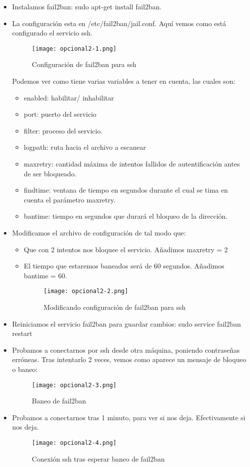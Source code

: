 	\begin{itemize}
		\item Instalamos fail2ban: sudo apt-get install fail2ban.
		\item La configuración esta en /etc/fail2ban/jail.conf. Aquí vemos como está configurado el servicio ssh.
		\begin{figure}[H]	
			\centering
			\texttt{[image: opcional2-1.png]} 
			\label{figura119} 
			\caption{Configuración de fail2ban para ssh}
		\end{figure} 
		Podemos ver como tiene varias variables a tener en cuenta, las cuales son:
		\begin{itemize}
			\item enabled: habilitar/ inhabilitar
			\item port: puerto del servicio
			\item filter: proceso del servicio.
			\item logpath: ruta hacia el archivo a escanear
			\item maxretry: cantidad máxima de intentos fallidos de autentificación antes de ser bloqueado.
			\item findtime: ventana de tiempo en segundos durante el cual se tima en cuenta el parámetro maxretry.
			\item bantime: tiempo en segundos que durará el bloqueo de la dirección.
		\end{itemize}
		\item Modificamos el archivo de configuración de tal modo que:
		\begin{itemize}
			\item Que con 2 intentos nos bloquee el servicio. Añadimos maxretry = 2
			\item El tiempo que estaremos baneados será de 60 segundos. Añadimos bantime = 60.
			\begin{figure}[H]	
				\centering
				\texttt{[image: opcional2-2.png]} 
				\label{figura120} 
				\caption{Modificando configuración de fail2ban para ssh}
			\end{figure}
		\end{itemize}
		\item Reiniciamos el servicio fail2ban para guardar cambios: sudo service fail2ban restart
		\item Probamos a conectarnos por ssh desde otra máquina, poniendo contraseñas erróneas. Tras intentarlo 2 veces, vemos como aparece un mensaje de bloqueo o baneo:
		\begin{figure}[H]	
			\centering
			\texttt{[image: opcional2-3.png]} 
			\label{figura121} 
			\caption{Baneo de fail2ban}
		\end{figure}
		\item Probamos a conectarnos tras 1 minuto, para ver si nos deja. Efectivamente si nos deja.
			\begin{figure}[H]	
				\centering
				\texttt{[image: opcional2-4.png]} 
				\label{figura122} 
				\caption{Conexión ssh tras esperar baneo de fail2ban}
			\end{figure}
	\end{itemize}
	
